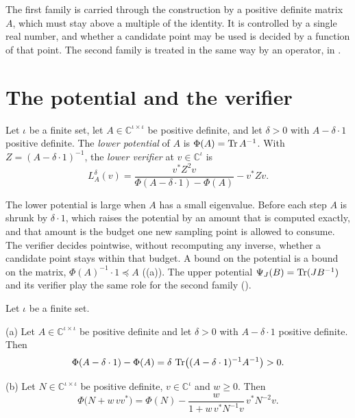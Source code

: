 The first family is carried through the construction by a positive definite matrix $A$,
which must stay above a multiple of the identity. It is controlled by a single real
number, and whether a candidate point may be used is decided by a function of that point.
The second family is treated in the same way by an operator, in .

\section{The potential and the verifier}

\begin{definition}
\label{def:lower-potential}
\leanok
Let $\iota$ be a finite set, let $A \in \mathbb{C}^{\iota \times \iota}$ be positive
definite, and let $\delta > 0$ with $A - \delta \cdot 1$ positive definite. The
\emph{lower potential} of $A$ is $\Phi(A) = \operatorname{Tr} A^{-1}$. With
$Z = (A - \delta \cdot 1)^{-1}$, the \emph{lower verifier} at $v \in \mathbb{C}^{\iota}$ is
\[
  L_A^{\delta}(v)
    = \frac{v^* Z^2 v}{\Phi(A - \delta \cdot 1) - \Phi(A)} - v^* Z v .
\]
\end{definition}

The lower potential is large when $A$ has a small eigenvalue. Before each step $A$ is
shrunk by $\delta \cdot 1$, which raises the potential by an amount that is computed
exactly, and that amount is the budget one new sampling point is allowed to consume. The
verifier decides pointwise, without recomputing any inverse, whether a candidate point
stays within that budget. A bound on the potential is a bound on the matrix,
$\Phi(A)^{-1} \cdot 1 \preceq A$ ((a)). The upper potential
$\Psi_J(B) = \operatorname{Tr} (J B^{-1})$ and its verifier play the same role for the second family
().

\begin{lemma}
\label{lem:lower-potential-change}
\leanok
{}
Let $\iota$ be a finite set.

(a) Let $A \in \mathbb{C}^{\iota \times \iota}$ be positive definite and let $\delta > 0$
with $A - \delta \cdot 1$ positive definite. Then
\[
  \Phi(A - \delta \cdot 1) - \Phi(A)
    = \delta \, \operatorname{Tr} \bigl( (A - \delta \cdot 1)^{-1} A^{-1} \bigr) > 0 .
\]

(b) Let $N \in \mathbb{C}^{\iota \times \iota}$ be positive definite,
$v \in \mathbb{C}^{\iota}$ and $w \geq 0$. Then
\[
  \Phi \bigl( N + w \, v v^* \bigr)
    = \Phi(N) - \frac{w}{1 + w \, v^* N^{-1} v} \, v^* N^{-2} v .
\]
\end{lemma}

